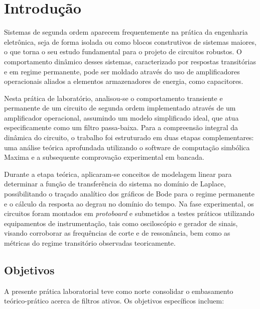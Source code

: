 \chapter{Introdução}

Sistemas de segunda ordem aparecem frequentemente na prática da engenharia eletrônica, seja de forma isolada ou como blocos construtivos de sistemas maiores, o que torna o seu estudo fundamental para o projeto de circuitos robustos. O comportamento dinâmico desses sistemas, caracterizado por respostas transitórias e em regime permanente, pode ser moldado através do uso de amplificadores operacionais aliados a elementos armazenadores de energia, como capacitores.

Nesta prática de laboratório, analisou-se o comportamento transiente e permanente de um circuito de segunda ordem implementado através de um amplificador operacional, assumindo um modelo simplificado ideal, que atua especificamente como um filtro passa-baixa. Para a compreensão integral da dinâmica do circuito, o trabalho foi estruturado em duas etapas complementares: uma análise teórica aprofundada utilizando o software de computação simbólica Maxima \cite{maxima} e a subsequente comprovação experimental em bancada.

Durante a etapa teórica, aplicaram-se conceitos de modelagem linear para determinar a função de transferência do sistema no domínio de Laplace, possibilitando o traçado analítico dos gráficos de Bode para o regime permanente e o cálculo da resposta ao degrau no domínio do tempo. Na fase experimental, os circuitos foram montados em \textit{protoboard} e submetidos a testes práticos utilizando equipamentos de instrumentação, tais como osciloscópio e gerador de sinais, visando corroborar as frequências de corte e de ressonância, bem como as métricas do regime transitório observadas teoricamente.

\section{Objetivos}

A presente prática laboratorial teve como norte consolidar o embasamento teórico-prático acerca de filtros ativos. Os objetivos específicos incluem:

